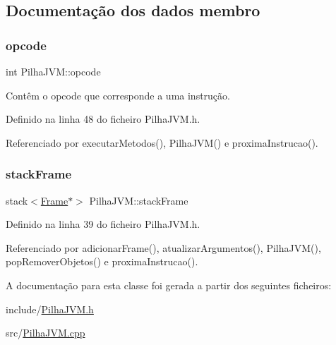 \subsection{Documentação dos dados membro}
\mbox{\label{classPilhaJVM_a90e6f9da43b72798ea0331c57b72af09}} 
\subsubsection{\texorpdfstring{opcode}{opcode}}
{\footnotesize\ttfamily int Pilha\+J\+V\+M\+::opcode\hspace{0.3cm}{\ttfamily [private]}}



Contêm o opcode que corresponde a uma instrução. 



Definido na linha 48 do ficheiro Pilha\+J\+V\+M.\+h.



Referenciado por executar\+Metodos(), Pilha\+J\+V\+M() e proxima\+Instrucao().

\mbox{\label{classPilhaJVM_a4d70c8b3d6fbddb38e943dc8b1a00c2d}} 
\subsubsection{\texorpdfstring{stack\+Frame}{stackFrame}}
{\footnotesize\ttfamily stack$<$\hyperlink{PilhaJVM_8h_acc380914b41a084dcc8e4b38fb200145}{Frame}$\ast$$>$ Pilha\+J\+V\+M\+::stack\+Frame\hspace{0.3cm}{\ttfamily [private]}}



Definido na linha 39 do ficheiro Pilha\+J\+V\+M.\+h.



Referenciado por adicionar\+Frame(), atualizar\+Argumentos(), Pilha\+J\+V\+M(), pop\+Remover\+Objetos() e proxima\+Instrucao().



A documentação para esta classe foi gerada a partir dos seguintes ficheiros\+:\begin{DoxyCompactItemize}
\item 
include/\hyperlink{PilhaJVM_8h}{Pilha\+J\+V\+M.\+h}\item 
src/\hyperlink{PilhaJVM_8cpp}{Pilha\+J\+V\+M.\+cpp}\end{DoxyCompactItemize}
